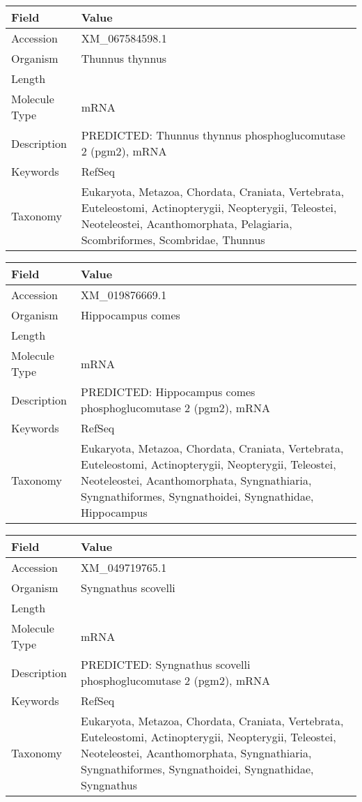 \documentclass[10pt]{article}
\begin{document}
{\footnotesize
\begin{longtable}{>{\raggedright\arraybackslash}p{4.5cm} >{\raggedright\arraybackslash}p{11.5cm}}
\textbf{Field} & \textbf{Value} \\
\hline
Accession & XM\_067584598.1 \\
Organism & Thunnus thynnus \\
Length & 2934 \\
Molecule Type & mRNA \\
Description & PREDICTED: Thunnus thynnus phosphoglucomutase 2 (pgm2), mRNA \\
Keywords & RefSeq \\
Taxonomy & Eukaryota, Metazoa, Chordata, Craniata, Vertebrata, Euteleostomi, Actinopterygii, Neopterygii, Teleostei, Neoteleostei, Acanthomorphata, Pelagiaria, Scombriformes, Scombridae, Thunnus \\
\end{longtable}
}

{\footnotesize
\begin{longtable}{>{\raggedright\arraybackslash}p{4.5cm} >{\raggedright\arraybackslash}p{11.5cm}}
\textbf{Field} & \textbf{Value} \\
\hline
Accession & XM\_019876669.1 \\
Organism & Hippocampus comes \\
Length & 2347 \\
Molecule Type & mRNA \\
Description & PREDICTED: Hippocampus comes phosphoglucomutase 2 (pgm2), mRNA \\
Keywords & RefSeq \\
Taxonomy & Eukaryota, Metazoa, Chordata, Craniata, Vertebrata, Euteleostomi, Actinopterygii, Neopterygii, Teleostei, Neoteleostei, Acanthomorphata, Syngnathiaria, Syngnathiformes, Syngnathoidei, Syngnathidae, Hippocampus \\
\end{longtable}
}

{\footnotesize
\begin{longtable}{>{\raggedright\arraybackslash}p{4.5cm} >{\raggedright\arraybackslash}p{11.5cm}}
\textbf{Field} & \textbf{Value} \\
\hline
Accession & XM\_049719765.1 \\
Organism & Syngnathus scovelli \\
Length & 2317 \\
Molecule Type & mRNA \\
Description & PREDICTED: Syngnathus scovelli phosphoglucomutase 2 (pgm2), mRNA \\
Keywords & RefSeq \\
Taxonomy & Eukaryota, Metazoa, Chordata, Craniata, Vertebrata, Euteleostomi, Actinopterygii, Neopterygii, Teleostei, Neoteleostei, Acanthomorphata, Syngnathiaria, Syngnathiformes, Syngnathoidei, Syngnathidae, Syngnathus \\
\end{longtable}
}
\end{document}
